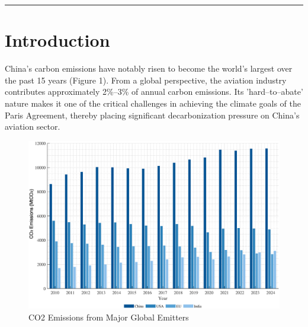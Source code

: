 \documentclass[a4paper,11pt]{article}
\begin{document}
\vspace{1em}
\hrule
\vspace{1.5em}



\section{Introduction}
China's carbon emissions have notably risen to become the world's largest over the past 15 years (Figure 1). From a global perspective, the aviation industry contributes approximately 2\%--3\% of annual carbon emissions. Its 'hard--to--abate' nature makes it one of the critical challenges in achieving the climate goals of the Paris Agreement, thereby placing significant decarbonization pressure on China's aviation sector.\\



\begin{figure}[htbp]
    \centering
    \includegraphics[width=0.9\linewidth]{global_co2_emissions.eps}
    \caption{CO2 Emissions from Major Global Emitters}
    \label{fig:co2_emissions}
\end{figure}
\end{document}
